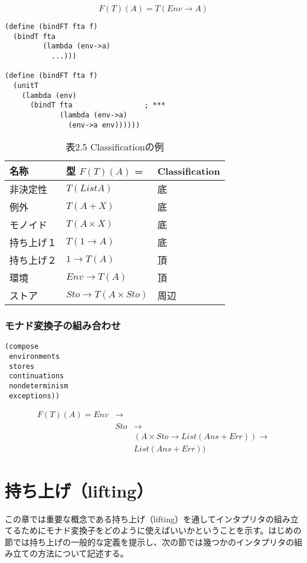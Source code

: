 \documentclass[11pt, oneside]{jsbook}   	%
\begin{document}
$$
F(T)(A) = T(Env \rightarrow A)
$$

\begin{lstlisting}
(define (bindFT fta f)
  (bindT fta
         (lambda (env->a)
           ...)))

(define (bindFT fta f)
  (unitT
    (lambda (env)
      (bindT fta                 ; ***
             (lambda (env->a)
               (env->a env))))))
\end{lstlisting}

\begin{table}[htb]
\label{table2.5}
\caption{表2.5 Classificationの例}
  \begin{tabular}{| l | l | l |} \hline
    名称   & 型 $F(T)(A)$ = & Classification  \\ \hline \hline
    非決定性     & $T(List A)$ & 底  \\
    例外            & $T(A + X)$ & 底  \\
    モノイド     & $T(A \times X)$ & 底  \\
    持ち上げ１ & $T(1 \rightarrow A)$ & 底  \\
    持ち上げ２ & $1 \rightarrow T(A) $ & 頂  \\
    環境            & $Env \rightarrow T(A) $ & 頂  \\ 
    ストア        &  $Sto \rightarrow T(A \times Sto) $ & 周辺  \\ \hline
  \end{tabular}
\end{table}
\subsection{ モナド変換子の組み合わせ }

\begin{lstlisting}
(compose
 environments
 stores
 continuations
 nondeterminism
 exceptions))
\end{lstlisting}
 
 $$
\begin{array}{lll}
F(T)(A) = Env &\rightarrow 	& 				 \\
			   &Sto 			&\rightarrow  	 \\
			   &				& (A \times  Sto \rightarrow List(Ans + Err)) \rightarrow \\
			   &				&				 List(Ans + Err))
\end{array}
 $$
 
\theendnotes
\setcounter{endnote}{0}

\newpage
\chapter{ 持ち上げ（lifting）}
 この章では重要な概念である持ち上げ（lifting）を通してインタプリタの組み立てるためにモナド変換子をどのように使えばいいかということを示す。はじめの節では持ち上げの一般的な定義を提示し、次の節では幾つかのインタプリタの組み立ての方法について記述する。
\end{document}
